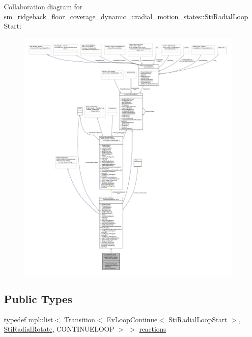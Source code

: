Collaboration diagram for sm\+\_\+ridgeback\+\_\+floor\+\_\+coverage\+\_\+dynamic\+\_\+:\+:radial\+\_\+motion\+\_\+states\+:\+:Sti\+Radial\+Loop\+Start\+:
\nopagebreak
\begin{figure}[H]
\begin{center}
\leavevmode
\includegraphics[width=350pt]{structsm__ridgeback__floor__coverage__dynamic__1_1_1radial__motion__states_1_1StiRadialLoopStart__coll__graph}
\end{center}
\end{figure}
\subsection*{Public Types}
\begin{DoxyCompactItemize}
\item 
typedef mpl\+::list$<$ Transition$<$ Ev\+Loop\+Continue$<$ \hyperlink{structsm__ridgeback__floor__coverage__dynamic__1_1_1radial__motion__states_1_1StiRadialLoopStart}{Sti\+Radial\+Loop\+Start} $>$, \hyperlink{structsm__ridgeback__floor__coverage__dynamic__1_1_1radial__motion__states_1_1StiRadialRotate}{Sti\+Radial\+Rotate}, C\+O\+N\+T\+I\+N\+U\+E\+L\+O\+OP $>$ $>$ \hyperlink{structsm__ridgeback__floor__coverage__dynamic__1_1_1radial__motion__states_1_1StiRadialLoopStart_addf4a71b8b7c86e0e764850cdeb252e7}{reactions}
\end{DoxyCompactItemize}
